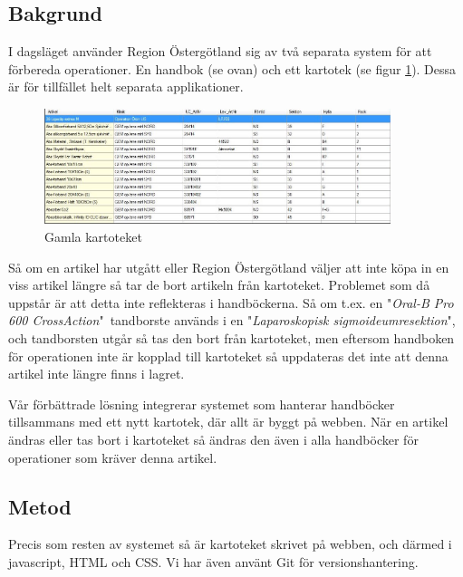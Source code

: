 \subsection{Bakgrund}
I dagsläget använder Region Östergötland sig av två separata system
för att förbereda operationer. En handbok (se ovan) och ett kartotek (se figur \ref{fig:kartotek}).
Dessa är för tillfället helt separata applikationer.

\begin{figure}[h!]
  \includegraphics[width=0.9\textwidth]{../images/forradsinfo.jpg}
  \caption{Gamla kartoteket}
  \label{fig:kartotek}
\end{figure}

Så om en artikel har utgått eller Region Östergötland
väljer att inte köpa in en viss artikel längre så tar de bort artikeln
från kartoteket. Problemet som då uppstår är att detta inte reflekteras
i handböckerna. Så om t.ex. en "\textit{Oral-B Pro 600 CrossAction}"\ tandborste används i
en "\textit{Laparoskopisk sigmoideumresektion}", och tandborsten utgår
så tas den bort från kartoteket, men eftersom handboken för operationen inte är
kopplad till kartoteket så uppdateras det inte att denna artikel inte längre finns i lagret.

Vår förbättrade lösning
integrerar systemet som hanterar handböcker tillsammans med ett nytt kartotek,
där allt är byggt på webben. När en artikel ändras eller tas bort i kartoteket
så ändras den även i alla handböcker för operationer som kräver denna artikel.



\subsection{Metod}
Precis som resten av systemet så är kartoteket skrivet på webben, och
därmed i javascript, HTML och CSS.
Vi har även använt Git för versionshantering.

